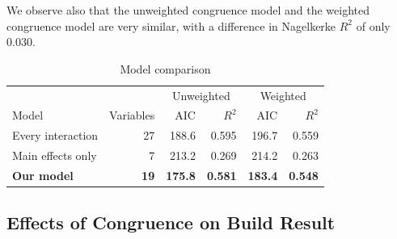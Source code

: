 We observe also that the unweighted congruence model and the weighted congruence model are very similar, with a difference in Nagelkerke $R^2$ of only 0.030.

\begin{table}[t]
\begin{center}
\begin{tabular}{l|r|rr|rr}

             & & \multicolumn{2}{c|}{Unweighted} & \multicolumn{2}{c}{Weighted} \\
Model                  & Variables    & AIC & $R^2$                       & AIC & $R^2$                      \\ \hline
Every interaction  & 27  & 188.6 & 0.595 & 196.7 & 0.559 \\
Main effects only & 7   & 213.2 & 0.269 & 214.2 & 0.263 \\
\textbf{Our model}         & \textbf{19}  & \textbf{175.8} & \textbf{0.581} & \textbf{183.4} & \textbf{0.548} \\
\hline
\end{tabular}
\end{center}
\caption{Model comparison}
\label{tab:models}
\end{table}

\subsection{Effects of Congruence on Build Result}
\label{sec:congruence_effect_build_result}

